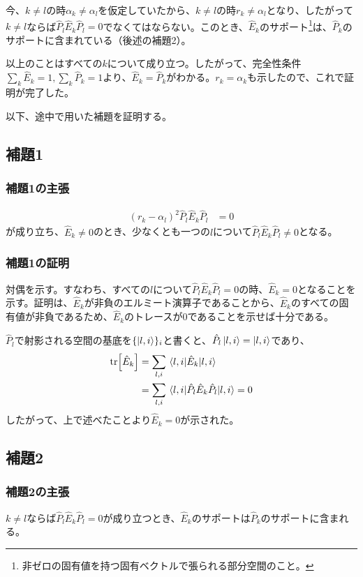 \documentclass[uplatex,dvipdfmx, a4j]{jsarticle}
\newcommand{\ope}[1]{\hat{#1}}
\newcommand{\proj}{\ope{P}}
\begin{document}
今、$k\neq l$の時$\alpha_k \neq \alpha_l$を仮定していたから、$k\neq l$の時$r_k \neq \alpha_l$となり、したがって$k\neq l$ならば$\proj_l\ope{E}_k\proj_l = 0$でなくてはならない。このとき、$\ope{E}_k$のサポート\footnote{非ゼロの固有値を持つ固有ベクトルで張られる部分空間のこと。}は、$\proj_k$のサポートに含まれている（後述の補題2）。

以上のことはすべての$k$について成り立つ。したがって、完全性条件$\sum_k\ope{E}_k = 1, \sum_k\proj_k = 1$より、$\ope{E}_k = \proj_k$がわかる。$r_k = \alpha_k$も示したので、これで証明が完了した。

以下、途中で用いた補題を証明する。
\subsection{補題1}
\subsubsection{補題1の主張}
\begin{align}
	(r_k-\alpha_l)^2 \proj_l\ope{E}_k\proj_l &= 0
\end{align}
が成り立ち、$\ope{E}_k\neq 0$のとき、少なくとも一つの$l$について$\proj_l\ope{E}_k\proj_l\neq 0$となる。
\subsubsection{補題1の証明}
対偶を示す。すなわち、すべての$l$について$\proj_l\ope{E}_k\proj_l = 0$の時、$\ope{E}_k = 0$となることを示す。証明は、$\ope{E}_k$が非負のエルミート演算子であることから、$\ope{E}_k$のすべての固有値が非負であるため、$\ope{E}_k$のトレースが0であることを示せば十分である。

$\proj_l$で射影される空間の基底を$\{\ket{l,i}\}_i$と書くと、$\proj_l\ket{l,i} = \ket{l,i}$であり、
\begin{align}
	\tr[\ope{E}_k] &= \sum_{l,i} \matrixel*{l,i}{\ope{E}_k}{l,i} \\
	&= \sum_{l,i} \matrixel*{l,i}{\proj_l\ope{E}_k\proj_l}{l,i} = 0
\end{align}
したがって、上で述べたことより$\ope{E}_k=0$が示された。

\subsection{補題2}
\subsubsection{補題2の主張}
$k\neq l$ならば$\proj_l\ope{E}_k\proj_l = 0$が成り立つとき、$\ope{E}_k$のサポートは$\proj_k$のサポートに含まれる。
\end{document}
